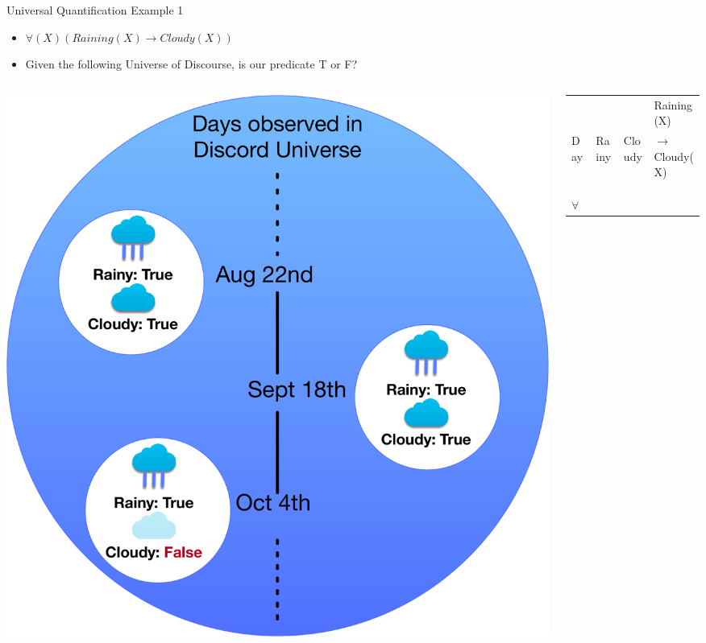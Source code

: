\documentclass[aspectratio=169]{beamer}
\begin{document}
\begin{frame}{Universal Quantification Example 1}

\begin{itemize}
\item $\forall(X)(Raining(X) \rightarrow Cloudy(X))$
\item Given the following Universe of Discourse, is our predicate T or F?
\end{itemize}
\begin{columns}
\begin{column}{0.5\textwidth}
{\centering\includegraphics[width=1\textwidth]{./lectRDBMS/univQuantEx.pdf}\par}
\end{column}
\begin{column}{0.5\textwidth}

\begin{tabular}{|l|l|l|l|}  \hline
	& &  & \textrm{Raining(X)} \\ 
\textrm{Day} & \textrm{Rainy}& \textrm{Cloudy} & $\rightarrow$ \textrm{Cloudy(X)}\\ \hline
 &  & &  \\ \hline
 &  & &  \\ \hline
 &  & &  \\ \hline \hline
$\forall$  & &  & \\ \hline
\end{tabular}\\


\end{column}
\end{columns}


\end{frame}
\end{document}
